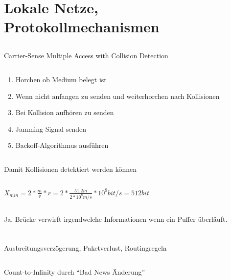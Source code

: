 \documentclass[a4paper]{article}
\begin{document}
\section{Lokale Netze, Protokollmechanismen}
\subsection{}
Carrier-Sense Multiple Access with Collision Detection
\subsection{}
\begin{enumerate}
\item Horchen ob Medium belegt ist
\item Wenn nicht anfangen zu senden und weiterhorchen nach Kollisionen
\item Bei Kollision aufhören zu senden
\item Jamming-Signal senden
\item Backoff-Algorithmus ausführen
\end{enumerate}
\subsection{}
Damit Kollisionen detektiert werden können
\subsection{}
$X_{min} = 2 * \frac{m}{v} * r = 2 * \frac{51.2m}{2*10^8 m/s} * 10^9 bit/s = 512 bit$
\subsection{}
Ja, Brücke verwirft irgendwelche Informationen wenn ein Puffer überläuft.
\pagebreak
\section{}
\subsection{}
Ausbreitungsverzögerung, Paketverlust, Routingregeln
\subsection{}
\subsection{}
Count-to-Infinity durch ``Bad News Änderung''
\pagebreak
\end{document}

